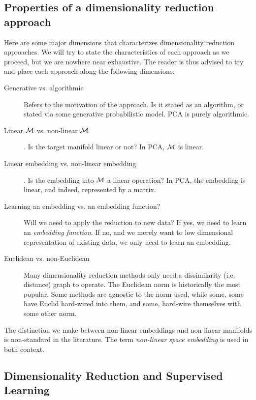 \documentclass[12pt,a4paper]{article}
\begin{document}
\subsection{Properties of a dimensionality reduction approach}
Here are some major dimensions that characterizes dimensionality reduction approaches. 
We will try to state the characteristics of each approach as we proceed, but we are nowhere near exhaustive.
The reader is thus advised to try and place each approach along the following dimensions:
\begin{description}
	\item [Generative vs. algorithmic] Refers to the motivation of the approach. Is it stated as an algorithm, or stated via some generative probabilistic model. 
	PCA is purely algorithmic. 

	\item [Linear $\mathcal{M}$ vs. non-linear $\mathcal{M}$]. 
	Is the target manifold linear or not?
	In PCA, $\mathcal{M}$ is linear.

	\item [Linear embedding vs. non-linear embedding]. 
	Is the embedding into $\mathcal{M}$ a linear operation?
	In PCA, the embedding is linear, and indeed, represented by a matrix. 
	
	\item [Learning an embedding vs. an embedding function?]
	Will we need to apply the reduction to new data? 
	If yes, we need to learn an \emph{embedding function}. 
	If no, and we merely want to low dimensional representation of existing data, we only need to learn an embedding. 
	
	\item [Euclidean vs. non-Euclidean] 
	Many dimensionality reduction methods only need a dissimilarity (i.e. distance) graph to operate. 
	The Euclidean norm is historically the most popular.
	Some methods are agnostic to the norm used, while some, some have Euclid hard-wired into them, and some, hard-wire themselves with some other norm. 
\end{description}

\begin{remark}
	The distinction we make between non-linear embeddings and non-linear manifolds is non-standard in the literature. 
	The term \emph{non-linear space embedding} is used in both context. 
\end{remark}


\subsection{Dimensionality Reduction and Supervised Learning}
\label{sec:dim-reduce-and-supervised}
\end{document}
